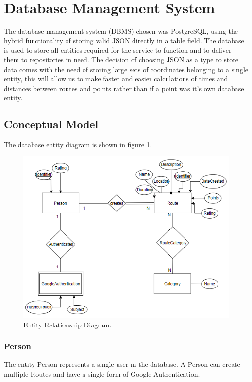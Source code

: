 \section*{Database Management System}
The database management system \cite{dbmsdefinition} (DBMS) chosen was PostgreSQL\cite{postgresql}, using the hybrid functionality of storing valid JSON\cite{postgresqljson} directly in a table
field. The database is used to store all entities required for the service to function and to deliver them to repositories in need. 
The decision of choosing JSON as a type to store data comes with the need of storing large sets of coordinates 
belonging to a single entity, this will allow us to make faster and easier calculations of times and distances 
between routes and points rather than if a point was it's own database entity. 

    \subsection*{Conceptual Model}
    The database entity diagram is shown in figure \ref{fig:erdiagram}.

    \begin{figure}[ht]            
        \includegraphics[width=\textwidth]{images/project-structure/dbms-structure.PNG}
        \caption{Entity Relationship Diagram.}
        \label{fig:erdiagram}
    \end{figure}   

        \subsubsection*{Person}
        The entity Person represents a single user in the database. A Person can create multiple Routes and have a
        single form of Google Authentication.

